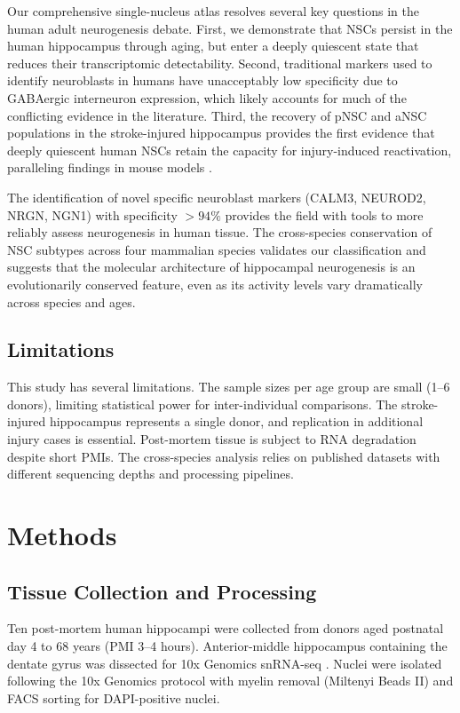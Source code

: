 \documentclass[11pt]{article}
\begin{document}
Our comprehensive single-nucleus atlas resolves several key questions in the human adult neurogenesis debate. First, we demonstrate that NSCs persist in the human hippocampus through aging, but enter a deeply quiescent state that reduces their transcriptomic detectability. Second, traditional markers used to identify neuroblasts in humans have unacceptably low specificity due to GABAergic interneuron expression, which likely accounts for much of the conflicting evidence in the literature. Third, the recovery of pNSC and aNSC populations in the stroke-injured hippocampus provides the first evidence that deeply quiescent human NSCs retain the capacity for injury-induced reactivation, paralleling findings in mouse models \citep{ming2011adult}.

The identification of novel specific neuroblast markers (CALM3, NEUROD2, NRGN, NGN1) with specificity $> 94\%$ provides the field with tools to more reliably assess neurogenesis in human tissue. The cross-species conservation of NSC subtypes across four mammalian species validates our classification and suggests that the molecular architecture of hippocampal neurogenesis is an evolutionarily conserved feature, even as its activity levels vary dramatically across species and ages.

\subsection{Limitations}

This study has several limitations. The sample sizes per age group are small (1--6 donors), limiting statistical power for inter-individual comparisons. The stroke-injured hippocampus represents a single donor, and replication in additional injury cases is essential. Post-mortem tissue is subject to RNA degradation despite short PMIs. The cross-species analysis relies on published datasets with different sequencing depths and processing pipelines.

\section{Methods}

\subsection{Tissue Collection and Processing}

Ten post-mortem human hippocampi were collected from donors aged postnatal day 4 to 68 years (PMI 3--4 hours). Anterior-middle hippocampus containing the dentate gyrus was dissected for 10x Genomics snRNA-seq \citep{zheng2017massively}. Nuclei were isolated following the 10x Genomics protocol with myelin removal (Miltenyi Beads II) and FACS sorting for DAPI-positive nuclei.
\end{document}
